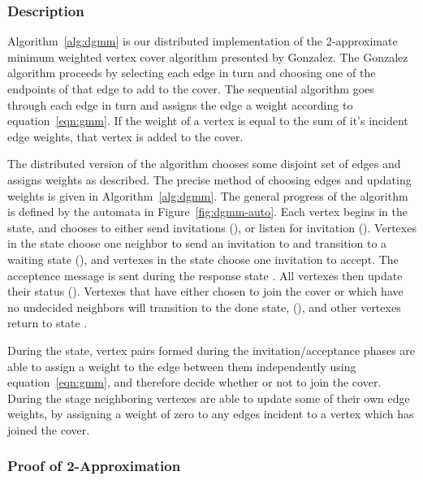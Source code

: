 \subsubsection{Description}
Algorithm~\ref{alg:dgmm} is our distributed implementation of the 2-approximate minimum weighted vertex cover algorithm presented by Gonzalez.\cite{Gonzalez1995129} The Gonzalez algorithm proceeds by selecting each edge in turn and choosing one of the endpoints of that edge to add to the cover. The sequential algorithm goes through each edge in turn and assigns the edge a weight according to equation~\ref{eqn:gmm}. If the weight of a vertex is equal to the sum of it's incident edge weights, that vertex is added to the cover. 



The distributed version of the algorithm chooses some disjoint set of edges and assigns weights as described. The precise method of choosing edges and updating weights is given in Algorithm~\ref{alg:dgmm}. The general progress of the algorithm is defined by the automata in Figure~\ref{fig:dgmm-auto}. Each vertex begins in the \cCd state, and chooses to either send invitations (\cId), or listen for invitation (\cLd). Vertexes in the \cId state choose one neighbor to send an invitation to and transition to a waiting state (\cWd), and vertexes in the \cLd state choose one invitation to accept. The acceptence message is sent during the response state \cRd. All vertexes then update their status (\cUd). Vertexes that have either chosen to join the cover or which have no undecided neighbors will transition to the done state, (\cDd), and other vertexes return to state \cCd.  



During the \cUd state, vertex pairs formed during the invitation/acceptance phases are able to assign a weight to the edge between them independently using equation~\ref{eqn:gmm}, and therefore decide whether or not to join the cover. During the \cEd stage neighboring vertexes are able to update some of their own edge weights, by assigning a weight of zero to any edges incident to a vertex which has joined the cover.



\subsubsection{Proof of 2-Approximation}


